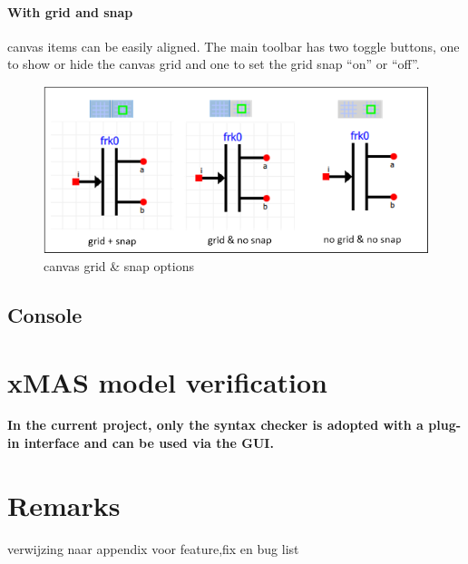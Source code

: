 \paragraph{With grid and snap} canvas items can be easily aligned. The main
toolbar has two toggle buttons, one to show or hide the canvas grid and one to
set the grid snap ``on'' or ``off''.

\begin{figure}[here]
\begin{center}	
	\includegraphics[width=.70\linewidth]{pictures/canvas-grid}
	\caption{canvas grid \& snap options}
	\label{fig:canvas-grid}
\end{center}
\end{figure}





\subsection{Console}



\section{xMAS model verification}
\begin{tcolorbox}[colback=white]
\textbf{
In the current project, only the syntax checker is adopted with a plug-in
interface and can be used via the GUI.
}
\end{tcolorbox}



\section{Remarks}

\begin{tcolorbox}[colback=yellow!30]
 verwijzing naar appendix voor feature,fix en bug list
\end{tcolorbox}




